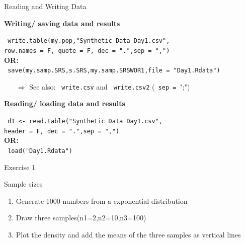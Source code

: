 \documentclass[11pt,german,hideothersubsections]{beamer}
\newcommand{\R}[1]{{\tt \color{blue}  #1}}
\begin{document}
\begin{frame}[fragile]{Reading and Writing Data}
\footnotesize{
\begin{center}
\textbf{Writing/ saving data and results}\\
\end{center}
\R{write.table(my.pop,"Synthetic Data Day1.csv",\\
            row.names = F, quote = F, dec = ".",sep = ",")}\\ 
            \textbf{OR:}\\
\R{save(my.samp.SRS,s.SRS,my.samp.SRSWOR1,file = "Day1.Rdata")}\\
\begin{itemize}
\item[$\Rightarrow$] See also: \R{write.csv} and \R{write.csv2} (\R{sep = }";")
\end{itemize}
\begin{center}
\textbf{Reading/ loading data and results}\\
\end{center}
\R{d1 <- read.table("Synthetic Data Day1.csv",\\
            header = F, dec = ".",sep = ",")}\\
            \textbf{OR:}\\
\R{load("Day1.Rdata")}}

\end{frame}
\begin{frame}[fragile]{Exercise 1}
\begin{exampleblock}{Sample sizes}
\begin{enumerate}
\item Generate 1000 numbers from a exponential distribution
\item Draw three samples(n1=2,n2=10,n3=100)
\item Plot the density and add the means of the three samples as vertical lines
\end{enumerate}
\end{exampleblock}
\end{frame}
\end{document}

